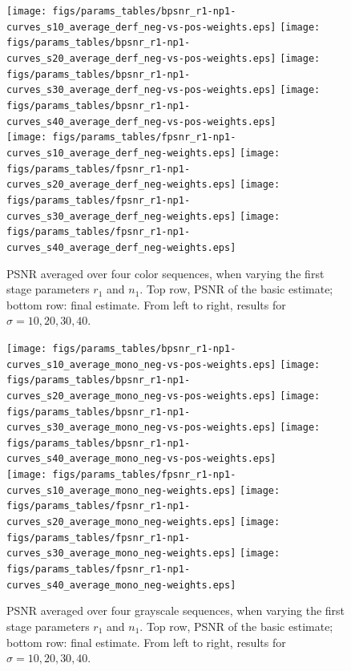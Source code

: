 \documentclass[10pt, a4paper]{article}
\begin{document}
\begin{figure}[htpb!]
	\begin{center}
		\texttt{[image: figs/params\_tables/bpsnr\_r1-np1-curves\_s10\_average\_derf\_neg-vs-pos-weights.eps]}%
		\texttt{[image: figs/params\_tables/bpsnr\_r1-np1-curves\_s20\_average\_derf\_neg-vs-pos-weights.eps]}%
		\texttt{[image: figs/params\_tables/bpsnr\_r1-np1-curves\_s30\_average\_derf\_neg-vs-pos-weights.eps]}%
		\texttt{[image: figs/params\_tables/bpsnr\_r1-np1-curves\_s40\_average\_derf\_neg-vs-pos-weights.eps]}\\

		\texttt{[image: figs/params\_tables/fpsnr\_r1-np1-curves\_s10\_average\_derf\_neg-weights.eps]}%
		\texttt{[image: figs/params\_tables/fpsnr\_r1-np1-curves\_s20\_average\_derf\_neg-weights.eps]}%
		\texttt{[image: figs/params\_tables/fpsnr\_r1-np1-curves\_s30\_average\_derf\_neg-weights.eps]}%
		\texttt{[image: figs/params\_tables/fpsnr\_r1-np1-curves\_s40\_average\_derf\_neg-weights.eps]}\\
	\end{center}
	\caption{PSNR averaged over four color sequences, when varying the
		first stage parameters $r_1$ and $n_1$. Top row, PSNR of the basic
		estimate; bottom row: final estimate. From left to right, results for
		$\sigma = 10, 20, 30, 40$.} 
	\label{fig:rank1-nsim1-psnr-color}

	\begin{center}
		\texttt{[image: figs/params\_tables/bpsnr\_r1-np1-curves\_s10\_average\_mono\_neg-vs-pos-weights.eps]}%
		\texttt{[image: figs/params\_tables/bpsnr\_r1-np1-curves\_s20\_average\_mono\_neg-vs-pos-weights.eps]}%
		\texttt{[image: figs/params\_tables/bpsnr\_r1-np1-curves\_s30\_average\_mono\_neg-vs-pos-weights.eps]}%
		\texttt{[image: figs/params\_tables/bpsnr\_r1-np1-curves\_s40\_average\_mono\_neg-vs-pos-weights.eps]}\\

		\texttt{[image: figs/params\_tables/fpsnr\_r1-np1-curves\_s10\_average\_mono\_neg-weights.eps]}%
		\texttt{[image: figs/params\_tables/fpsnr\_r1-np1-curves\_s20\_average\_mono\_neg-weights.eps]}%
		\texttt{[image: figs/params\_tables/fpsnr\_r1-np1-curves\_s30\_average\_mono\_neg-weights.eps]}%
		\texttt{[image: figs/params\_tables/fpsnr\_r1-np1-curves\_s40\_average\_mono\_neg-weights.eps]}\\
	\end{center}
	\caption{PSNR averaged over four grayscale sequences, when varying the
		first stage parameters $r_1$ and $n_1$. Top row, PSNR of the basic
		estimate; bottom row: final estimate. From left to right, results for
		$\sigma = 10, 20, 30, 40$.} 
	\label{fig:rank1-nsim1-psnr-gray}
\end{figure}
\end{document}

